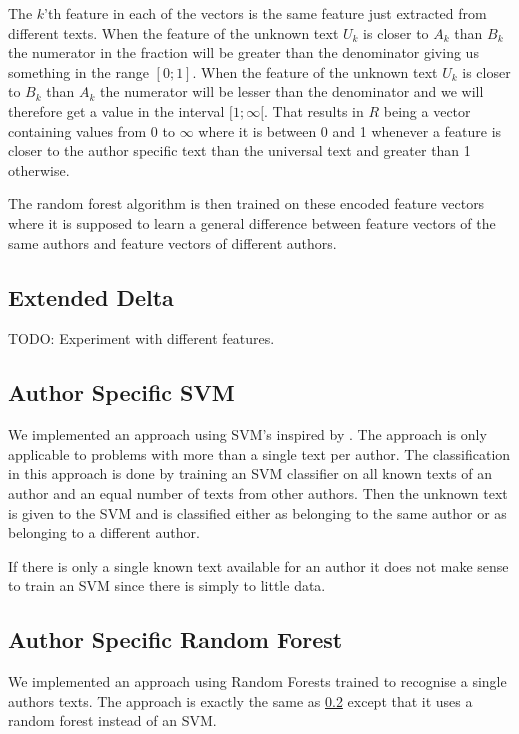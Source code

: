 The $k$'th feature in each of the vectors is the same feature just extracted
from different texts. When the feature of the unknown text $U_k$ is closer to
$A_k$ than $B_k$ the numerator in the fraction will be greater than the
denominator giving us something in the range $[0; 1]$. When the feature of the
unknown text $U_k$ is closer to $B_k$ than $A_k$ the numerator will be lesser
than the denominator and we will therefore get a value in the interval
$[1; \infty[$. That results in $R$ being a vector containing values from 0 to
$\infty$ where it is between 0 and 1 whenever a feature is closer to the author
specific text than the universal text and greater than 1 otherwise.

The random forest algorithm is then trained on these encoded feature vectors
where it is supposed to learn a general difference between feature vectors of
the same authors and feature vectors of different authors.

\subsection{Extended Delta}
TODO: Experiment with different features.

\subsection{Author Specific SVM} \label{subsec:author_specific_svm}
We implemented an approach using \gls{SVM}'s inspired by \cite{hansen2014}. The
approach is only applicable to problems with more than a single text per author.
The classification in this approach is done by training an \gls{SVM} classifier
on all known texts of an author and an equal number of texts from other authors.
Then the unknown text is given to the \gls{SVM} and is classified either as
belonging to the same author or as belonging to a different author.

If there is only a single known text available for an author it does not make
sense to train an \gls{SVM} since there is simply to little data.

\subsection{Author Specific Random Forest}
We implemented an approach using Random Forests trained to recognise a single
authors texts. The approach is exactly the same as
\ref{subsec:author_specific_svm} except that it uses a random forest instead of
an \gls{SVM}.


